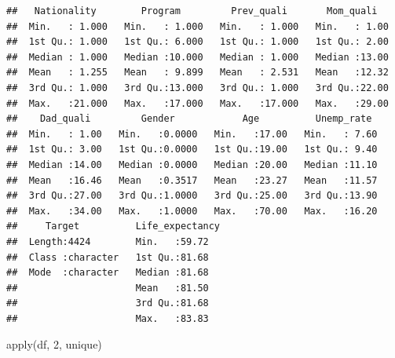 \documentclass[
]{article}
\newenvironment{Shaded}{\begin{snugshade}}{\end{snugshade}}
\newcommand{\DecValTok}[1]{\textcolor[rgb]{0.00,0.00,0.81}{#1}}
\newcommand{\FunctionTok}[1]{\textcolor[rgb]{0.00,0.00,0.00}{#1}}
\newcommand{\NormalTok}[1]{#1}
\begin{document}
\begin{verbatim}
##   Nationality        Program         Prev_quali       Mom_quali    
##  Min.   : 1.000   Min.   : 1.000   Min.   : 1.000   Min.   : 1.00  
##  1st Qu.: 1.000   1st Qu.: 6.000   1st Qu.: 1.000   1st Qu.: 2.00  
##  Median : 1.000   Median :10.000   Median : 1.000   Median :13.00  
##  Mean   : 1.255   Mean   : 9.899   Mean   : 2.531   Mean   :12.32  
##  3rd Qu.: 1.000   3rd Qu.:13.000   3rd Qu.: 1.000   3rd Qu.:22.00  
##  Max.   :21.000   Max.   :17.000   Max.   :17.000   Max.   :29.00  
##    Dad_quali         Gender            Age          Unemp_rate   
##  Min.   : 1.00   Min.   :0.0000   Min.   :17.00   Min.   : 7.60  
##  1st Qu.: 3.00   1st Qu.:0.0000   1st Qu.:19.00   1st Qu.: 9.40  
##  Median :14.00   Median :0.0000   Median :20.00   Median :11.10  
##  Mean   :16.46   Mean   :0.3517   Mean   :23.27   Mean   :11.57  
##  3rd Qu.:27.00   3rd Qu.:1.0000   3rd Qu.:25.00   3rd Qu.:13.90  
##  Max.   :34.00   Max.   :1.0000   Max.   :70.00   Max.   :16.20  
##     Target          Life_expectancy
##  Length:4424        Min.   :59.72  
##  Class :character   1st Qu.:81.68  
##  Mode  :character   Median :81.68  
##                     Mean   :81.50  
##                     3rd Qu.:81.68  
##                     Max.   :83.83
\end{verbatim}

\begin{Shaded}
\begin{Highlighting}[]
\FunctionTok{apply}\NormalTok{(df, }\DecValTok{2}\NormalTok{, unique)}
\end{Highlighting}
\end{Shaded}
\end{document}
